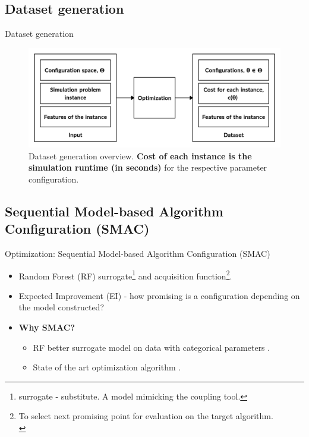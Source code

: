 \documentclass[10pt]{beamer}
\begin{document}
\subsection{Dataset generation}
\begin{frame}{Dataset generation}
\begin{figure}[h!]
\centering
\includegraphics[width=\linewidth]{images/Optimizationphase_new.jpg}
\caption{Dataset generation overview. \textbf{Cost of each instance is the simulation runtime (in seconds)} for the respective parameter configuration.}
\end{figure}  
\end{frame}


\subsection{Sequential Model-based Algorithm Configuration (SMAC)}
\begin{frame}[t]{Optimization: Sequential Model-based Algorithm Configuration (SMAC)}

\begin{itemize}
\item Random Forest (RF) surrogate\footnote{surrogate - substitute. A model mimicking the coupling tool.} and acquisition function\footnote{To select next promising point for evaluation on the target algorithm.\\}.
\newline
\item Expected Improvement (EI) - how promising is a configuration depending on the model constructed?
\newline
\item <2- > \textbf{Why SMAC?}
\newline
\begin{itemize}
\item RF better surrogate model on data with categorical parameters \cite{Hutterphd} \cite{SMAC_mainpaper}.
\newline
\item State of the art optimization algorithm \cite{SMAC_ParamILS_GGA_compare}.
\end{itemize}
\end{itemize}
\end{frame}
\end{document}
